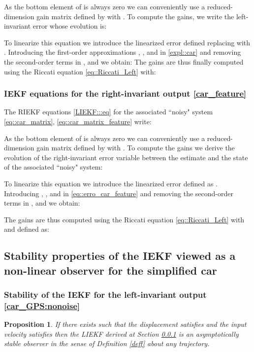 \documentclass[a4paper,12pt,onecolumn]{article}
\newtheorem{prop}{Proposition}
\begin{document}
As the bottom element of  is always zero we can conveniently use a reduced-dimension gain matrix  defined by  with . To compute the gains, we write the left-invariant error  
whose evolution is:

To linearize this equation we introduce the linearized error  defined replacing  with . Introducing the first-order approximations , ,  and  in \eqref{expl::car} and removing the second-order terms in ,  and  we obtain:
  The gains  are thus finally computed using the Riccati equation \eqref{eq::Riccati_Left} with:
 







\subsubsection{IEKF equations for the right-invariant output \eqref{car_feature}}\label{etouais}


The RIEKF equations \eqref{LIEKF:::eq} for the associated ``noisy" system \eqref{eq::car_matrix}, \eqref{eq::car_matrix_feature} write:

As the bottom element of  is always zero we can conveniently use a reduced-dimension gain matrix  defined by  with . To compute the gains  we derive the evolution of the right-invariant error variable 
 between the estimate and the state of the associated ``noisy" system:

To linearize this equation we introduce the linearized error  defined as . Introducing , ,  and  in \eqref{eq::erro_car_feature} and removing the second-order terms in ,  and  we obtain:

 The gains are thus computed using the Riccati equation \eqref{eq::Riccati_Left} with  and  defined as:

 



 \subsection{Stability properties of the IEKF viewed as a non-linear observer for the simplified car}
 
 \subsubsection{Stability of the IEKF for the left-invariant output \eqref{car_GPS:nonoise}}

\begin{prop}
\label{prop::car}
If  there exists  such that the displacement satisfies  and the input velocity satisfies   then the LIEKF derived at Section \ref{etouais} is an asymptotically stable observer in the sense of Definition \ref{deff} about \emph{any} trajectory.
\end{prop}
\end{document}
